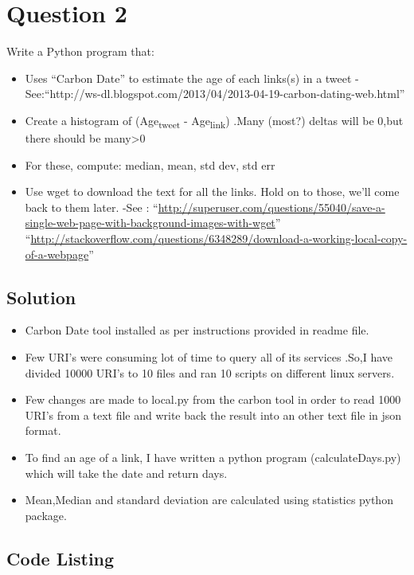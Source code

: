 
\section{Question 2}
\label{part2}
Write a Python program that:
\begin{itemize} 
\item Uses ``Carbon Date'' to estimate the age of each links(s) in a tweet
		-See:``http://ws-dl.blogspot.com/2013/04/2013-04-19-carbon-dating-web.html''
\item Create a histogram of (Age\textsubscript{tweet} - Age\textsubscript{link})
	    .Many (most?) deltas will be 0,but there should be many>0
\item For these, compute: median, mean, std dev, std err 


\item Use wget to download the text for all the links. Hold on to those,
		 we'll come back to them later.
		 -See :
		 	   ``\url{http://superuser.com/questions/55040/save-a-single-web-page-with-background-images-with-wget}''
		 	   ``\url{http://stackoverflow.com/questions/6348289/download-a-working-local-copy-of-a-webpage}''
\end{itemize}

\subsection{Solution}
\begin{itemize}
\item Carbon Date tool installed as per instructions provided in readme file.
\item Few URI's were consuming lot of time to query all of its services .So,I have divided 10000 URI's to 10 files and ran 
	  10 scripts on different linux servers. 
\item Few changes are made to local.py from the carbon tool in order to read 1000 URI's from a text file and write back the result into
	  an other text file in json format. 
\item To find an age of a link, I have written a python program (calculateDays.py) which will take the date and return days. 
\item Mean,Median and standard deviation are calculated using statistics python package.
\end{itemize}

\subsection{Code Listing}
